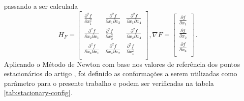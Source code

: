 %
passando a ser calculada
%
\begin{equation}
  H_F = 
  \begin{bmatrix}
    \frac{\partial^2 f}{\partial x_1^2}& 
    \frac{\partial^2 f}{\partial x_1 \partial x_2}&
    \frac{\partial^2 f}{\partial x_1 \partial x_4}\\

    \frac{\partial^2 f}{\partial x_2 \partial x_1}&
    \frac{\partial^2 f}{\partial x_2^2}&
    \frac{\partial^2 f}{\partial x_2 \partial x_4}\\

    \frac{\partial^2 f}{\partial x_4 \partial x_1}&
    \frac{\partial^2 f}{\partial x_4 \partial x_2}&
    \frac{\partial^2 f}{\partial x_4^2}\\
  \end{bmatrix}
  , \nabla F =
  \begin{bmatrix}
    \frac{\partial f}{\partial x_1}\\
    \frac{\partial f}{\partial x_2}\\
    \frac{\partial f}{\partial x_4}\\
  \end{bmatrix} \,.
\end{equation}
%
Aplicando o Método de Newton com base nos valores de referência dos pontos estacionários do artigo \cite{fh2o_first_sep}, foi definido as conformações a serem utilizadas como parâmetro para o presente trabalho e podem ser verificadas na tabela \ref{tab:stacionary-config}.


